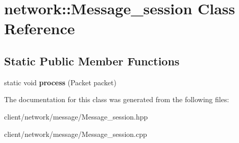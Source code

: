\hypertarget{classnetwork_1_1_message__session}{\section{network\-:\-:Message\-\_\-session Class Reference}
\label{classnetwork_1_1_message__session}
}
\subsection*{Static Public Member Functions}
\begin{DoxyCompactItemize}
\item 
\hypertarget{classnetwork_1_1_message__session_a1a62b7bff43bc57b4bbf1cb818e8f474}{static void {\bfseries process} (Packet packet)}\label{classnetwork_1_1_message__session_a1a62b7bff43bc57b4bbf1cb818e8f474}

\end{DoxyCompactItemize}


The documentation for this class was generated from the following files\-:\begin{DoxyCompactItemize}
\item 
client/network/message/Message\-\_\-session.\-hpp\item 
client/network/message/Message\-\_\-session.\-cpp\end{DoxyCompactItemize}
